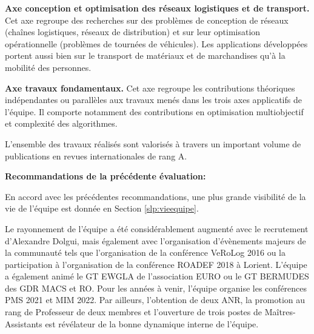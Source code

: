 \textbf{Axe conception et optimisation des réseaux logistiques et de transport.}
Cet axe regroupe des recherches sur des problèmes de conception de réseaux (chaînes logistiques, réseaux de distribution) et sur leur optimisation opérationnelle (problèmes de tournées de véhicules). 
Les applications développées portent aussi bien sur le transport de matériaux et de marchandises qu'à la mobilité des personnes. 

\textbf{Axe travaux fondamentaux.}
Cet axe regroupe les contributions théoriques indépendantes ou parallèles aux travaux menés dans les trois axes applicatifs de l'équipe. 
Il comporte notamment des contributions en optimisation multiobjectif et complexité des algorithmes. 

\smallskip
L'ensemble des travaux réalisés sont valorisés à travers un important volume de publications en revues internationales de rang A.

\textbf{Recommandations de la précédente évaluation:}

En accord avec les précédentes recommandations, une plus grande visibilité de la vie de l'équipe est donnée en Section \ref{slp:vieequipe}.

Le rayonnement de l'équipe a été considérablement augmenté avec le recrutement d'Alexandre Dolgui, mais également avec l'organisation d'évènements majeurs de la communauté tels que l'organisation de la conférence VeRoLog 2016 ou la participation à l'organisation de la conférence ROADEF 2018 à Lorient. 
L'équipe a également animé le GT EWGLA de l'association EURO ou le GT BERMUDES des GDR MACS et RO.
Pour les années à venir, l'équipe organise les conférences PMS 2021 et MIM 2022.
Par ailleurs, l'obtention de deux ANR, la promotion au rang de Professeur de deux membres et l'ouverture de trois postes de Maîtres-Assistants est révélateur de la bonne dynamique interne de l'équipe.


